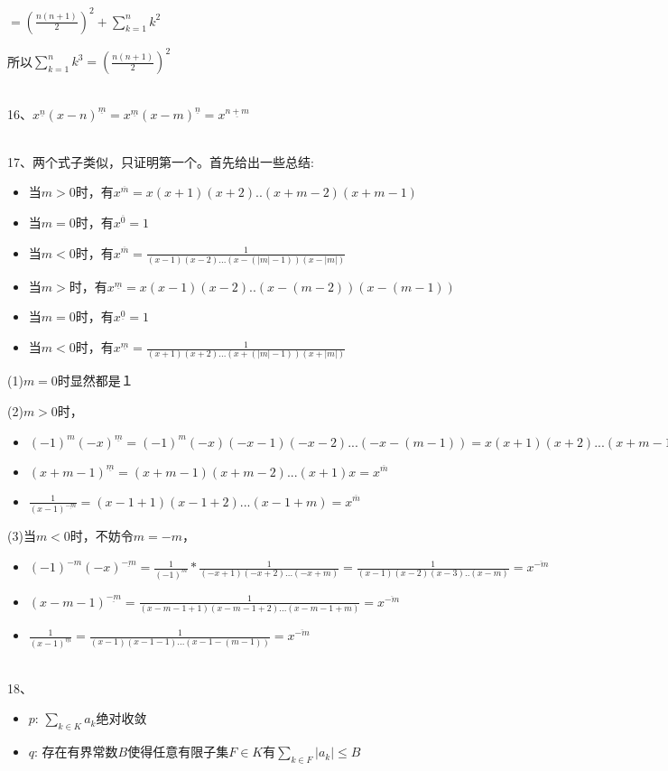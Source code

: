 \documentclass[onecolumn]{article}
\begin{document}
$=(\frac{n(n+1)}{2})^{2}+\sum_{k=1}^{n}k^{2}$\par
所以$\sum_{k=1}^{n}k^{3}=(\frac{n(n+1)}{2})^{2}$\par
~\\
16、$x^{\underline{n}}(x-n)^{\underline{m}}=x^{\underline{m}}(x-m)^{\underline{n}}=x^{\underline{n+m}}$ \par
~\\
17、两个式子类似，只证明第一个。首先给出一些总结:\par
\begin{itemize}
	\item 当$m>0$时，有$x^{\overline{m}}=x(x+1)(x+2)..(x+m-2)(x+m-1)$
	\item 当$m=0$时，有$x^{\overline{0}}=1$
	\item 当$m<0$时，有$x^{\overline{m}}=\frac{1}{(x-1)(x-2)...(x-(|m|-1))(x-|m|)}$
	\item 当$m>$时，有$x^{\underline{m}}=x(x-1)(x-2)..(x-(m-2))(x-(m-1))$
	\item 当$m=0$时，有$x^{\underline{0}}=1$
	\item 当$m<0$时，有$x^{\underline{m}}=\frac{1}{(x+1)(x+2)...(x+(|m|-1))(x+|m|)}$
\end{itemize}
 (1)$m=0$时显然都是１ \par
 (2)$m>0$时，
\begin{itemize}
	\item $(-1)^{m}(-x)^{\underline{m}}=(-1)^{m}(-x)(-x-1)(-x-2)...(-x-(m-1))=x(x+1)(x+2)...(x+m-1)=x^{\overline{m}}$
	\item $(x+m-1)^{\underline{m}}=(x+m-1)(x+m-2)...(x+1)x=x^{\overline{m}}$
	\item $\frac{1}{(x-1)^{\underline{-m}}}=(x-1+1)(x-1+2)...(x-1+m)=x^{\overline{m}}$
\end{itemize}
(3)当$m<0$时，不妨令$m=-m$，
\begin{itemize}
	\item $(-1)^{-m}(-x)^{\underline{-m}}=\frac{1}{(-1)^{m}}*\frac{1}{(-x+1)(-x+2)...(-x+m)}=\frac{1}{(x-1)(x-2)(x-3)..(x-m)}=x^{\overline{-m}}$
	\item $(x-m-1)^{\underline{-m}}=\frac{1}{(x-m-1+1)(x-m-1+2)...(x-m-1+m)}=x^{\overline{-m}}$
	\item $\frac{1}{(x-1)^{\underline{m}}}=\frac{1}{(x-1)(x-1-1)...(x-1-(m-1))}=x^{\overline{-m}}$
\end{itemize}
~\\
18、\begin{itemize}
	\item $p$: $\sum_{k \in K}a_{k}$绝对收敛
	\item $q$: 存在有界常数$B$使得任意有限子集$F \in K$有$\sum_{k \in F}|a_{k}| \leq B$
\end{itemize}
\end{document}
